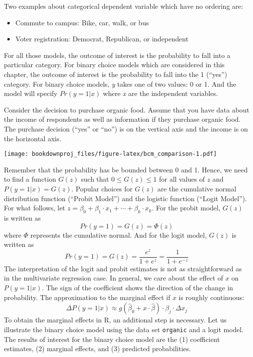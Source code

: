\documentclass[
]{article}
\providecommand{\tightlist}{%
  \setlength{\itemsep}{0pt}\setlength{\parskip}{0pt}}
\begin{document}
Two examples about categorical dependent variable which have no ordering are:

\begin{itemize}
\tightlist
\item
  Commute to campus: Bike, car, walk, or bus
\item
  Voter registration: Democrat, Republican, or independent
\end{itemize}

For all those models, the outcome of interest is the probability to fall into a particular category. For binary choice models which are considered in this chapter, the outcome of interest is the probability to fall into the 1 (``yes'') category. For binary choice models, \emph{y} takes one of two values: 0 or 1. And the model will specify \(Pr(y=1|x)\) where \emph{x} are the independent variables.

Consider the decision to purchase organic food. Assume that you have data about the income of respondents as well as information if they purchase organic food. The purchase decision (``yes'' or ``no'') is on the vertical axis and the income is on the horizontal axis.

\texttt{[image: bookdownproj\_files/figure-latex/bcm\_comparison-1.pdf]}

Remember that the probability has be bounded between 0 and 1. Hence, we need to find a function \(G(z)\) such that \(0 \leq G(z) \leq 1\) for all values of \(z\) and \(P(y=1|x)=G(z)\). Popular choices for \(G(z)\) are the cumulative normal distribution function (``Probit Model'') and the logistic function (``Logit Model''). For what follows, let \(z=\beta_0+\beta_1 \cdot x_1 + \cdots + \beta_k \cdot x_k\). For the probit model, \(G(z)\) is written as
\[Pr(y = 1) = G(z)=\Phi(z)\]
where \(\Phi\) represents the cumulative normal. And for the logit model, \(G(z)\) is written as
\[Pr(y = 1) = G(z)=\frac{e^z}{1+e^z}=\frac{1}{1+e^{-z}}\]
The interpretation of the logit and probit estimates is not as straightforward as in the multivariate regression case. In general, we care about the effect of \(x\) on \(P(y=1|x)\). The sign of the coefficient shows the direction of the change in probability. The approximation to the marginal effect if \(x\) is roughly continuous:
\[\Delta P(y=1|x) \approx g(\hat{\beta}_0 + x \cdot \hat{\beta}) \cdot \beta_j \cdot \Delta x_j\]
To obtain the marginal effects in R, an additional step is necessary. Let us illustrate the binary choice model using the data set \texttt{organic} and a logit model. The results of interest for the binary choice model are the (1) coefficient estimates, (2) marginal effects, and (3) predicted probabilities.
\end{document}

